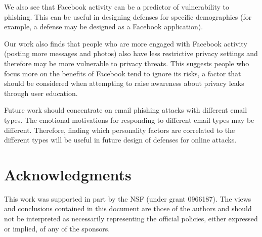 \documentclass{sig-alternate}
\begin{document}
We also see that Facebook activity can be a predictor of vulnerability to phishing. This can be useful in designing defenses 
for specific demographics (for example, a defense may be designed as a Facebook application).

Our work also finds that people who are more engaged with Facebook activity (posting more messages and photos) also have less restrictive privacy settings and therefore may be more vulnerable to privacy threats. 
This suggests people who focus more on the benefits of Facebook tend to ignore its risks, a factor that should be considered when attempting to raise awareness about privacy leaks through user education.


Future work should concentrate on email phishing attacks with different email types. The emotional motivations for responding to different email types may be different. Therefore, finding which personality factors are correlated to the different types will be useful in future design of defenses for online attacks.














\section{Acknowledgments}
\label{sec:ack}

This work was supported in part by the NSF (under grant 0966187). The views and conclusions contained in this document are those of the authors and should not be interpreted as necessarily representing the official policies, either expressed or implied, of any of the sponsors.
















\end{document}
